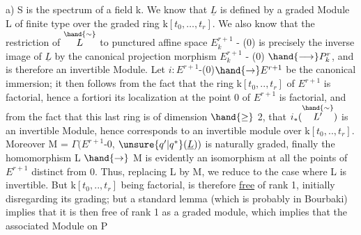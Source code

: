 a) S is the spectrum of a field k. We know that $\underline{L}$ is defined
by a graded Module L of finite type over the graded ring k$[t_0,\ldots,t_r]$.
We also know that the restriction  of $\overset{\hand{\sim}}{L}$ to punctured affine space
$E_k^{r+1}$ - (0) is precisely the inverse image of $\underline{L}$ by the canonical projection
morphism  $E_k^{r+1}$ - (0) $\hand{\longrightarrow} P_k^r$, and is therefore an invertible
Module. Let $i : E^{r+1}$-(0)$\hand{\to} E^{r+1}$ be the canonical immersion; it then follows
from the fact that the  ring k$[t_0,..,t_r]$ of $E^{r+1}$ is factorial, hence a
fortiori its localization at the point 0 of $E^{r+1}$ is factorial, and from the fact
that this last ring is of dimension $\hand{\geq}$ 2, that $i_*(\overset{\hand{\sim}}{L'})$ is an invertible
Module,  hence corresponds to an invertible module  over
k$[t_0,..,t_r]$. Moreover M = $\Gamma(E^{r+1}$-0, $\unsure{q'|q^*}(\underline{L}))$ is naturally graded,
finally the homomorphism L $\hand{\to}$ M is evidently an isomorphism
at all the  points of $E^{r+1}$ distinct from 0. Thus, replacing
L by M, we reduce to the case where L is invertible. But
k$[t_0,..,t_r]$ being factorial,  is therefore \uline{free} of rank 1, initially
disregarding its grading; but a standard lemma (which is probably
in Bourbaki) implies that it is then free of rank 1
as a graded module, which implies that the associated Module on P

